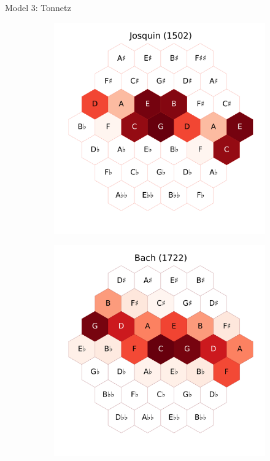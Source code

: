 \documentclass[final,cmyk]{beamer}
\begin{document}
\begin{frame}[t]
\begin{minipage}[t][.68\textheight][t]{\textwidth}
\begin{columns}[t]
\begin{column}{0.3\textwidth}
\begin{block}{Model 3: Tonnetz}
				\begin{figure}
				\centering
				\begin{subfigure}{\textwidth} %
					\includegraphics[width=\textwidth]{img/josquin_tonnetz.png}
				\end{subfigure}
				\begin{subfigure}{\textwidth} %
					\includegraphics[width=\textwidth]{img/bach_tonnetz.png}

\end{subfigure}
\end{figure}
\end{block}
\end{column}
\end{columns}
\end{minipage}
\end{frame}
\end{document}
